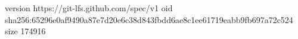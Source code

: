 version https://git-lfs.github.com/spec/v1
oid sha256:65296e0af9490a87e7d20e6c38d843fbdd6ae8c1ee61719eabb9fb697a72c524
size 174916
